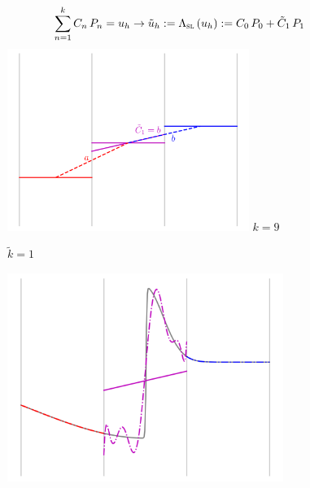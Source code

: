 \documentclass{beamer}
\begin{document}
\begin{frame}
\begin{figure}
\begin{overprint}
        $$\sum\limits_{n=1}^{k}C_{n} \, P_{n} = u_{h}
        \to \tilde{u}_{h} := \Lambda_{\textsc{sl}}\left(u_{h}\right)
        := C_{0} \, P_{0} + \tilde{C}_{1} \, P_{1}$$
        \centering\includegraphics[width=0.7\textwidth]{./fig.sl_06.png}
        $k = 9$

        $\tilde{k} = 1$

        \centering\includegraphics[width=0.8\textwidth]{./fig.sl_07.png}
    \end{overprint}
  \end{figure}

\end{frame}
\end{document}
